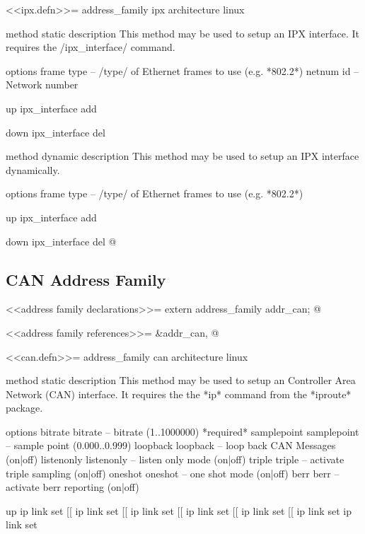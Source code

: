 \documentclass{article}
\begin{document}
<<ipx.defn>>=
address_family ipx
architecture linux

method static
  description
    This method may be used to setup an IPX interface.  It requires the
    /ipx_interface/ command.

  options
    frame type             -- /type/ of Ethernet frames to use (e.g. *802.2*)
    netnum id              -- Network number

  up
    ipx_interface add %

  down
    ipx_interface del %

method dynamic
  description
    This method may be used to setup an IPX interface dynamically.

  options
    frame type             -- /type/ of Ethernet frames to use (e.g. *802.2*)

  up
    ipx_interface add %

  down
    ipx_interface del %
@ 

\subsection{CAN Address Family}

<<address family declarations>>=
extern address_family addr_can;
@ 

<<address family references>>=
&addr_can,
@ 

<<can.defn>>=
address_family can
architecture linux

method static
  description
    This method may be used to setup an Controller Area Network (CAN)
    interface. It requires the the *ip* command from the *iproute* package.

  options
    bitrate bitrate		-- bitrate (1..1000000) *required*
    samplepoint samplepoint	-- sample point (0.000..0.999)
    loopback loopback		-- loop back CAN Messages (on|off)
    listenonly listenonly	-- listen only mode (on|off)
    triple triple		-- activate triple sampling (on|off)
    oneshot oneshot		-- one shot mode (on|off)
    berr berr			-- activate berr reporting (on|off) 

  up
    ip link set %
    [[ ip link set %
    [[ ip link set %
    [[ ip link set %
    [[ ip link set %
    [[ ip link set %
    ip link set %
\end{document}

